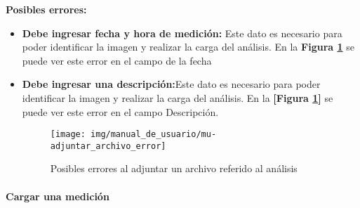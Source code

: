  	\textbf{Posibles errores:}
 	\begin{itemize}
 		\item \textbf{Debe ingresar fecha y hora de medición:} Este dato es necesario para poder identificar la imagen y realizar la carga del análisis. En la \textbf{Figura \ref{mu-adjuntar_archivo_error}} se puede ver este error en el campo de la fecha
 		\item \textbf{Debe ingresar una descripción:}Este dato es necesario para poder identificar la imagen y realizar la carga del análisis. En la \textbf{[Figura \ref{mu-adjuntar_archivo_error}]} se puede ver este error en el campo Descripción.
 		
 		\begin{figure}
 			\centering
 			\texttt{[image: img/manual\_de\_usuario/mu-adjuntar\_archivo\_error]}
 			\caption{Posibles errores al adjuntar un archivo referido al análisis}
 			\label{mu-adjuntar_archivo_error}	
 		\end{figure}
 		
 		
 	\end{itemize}
 	
 	
 		
\paragraph{Cargar una medición} 
 	
